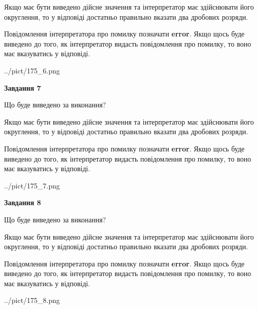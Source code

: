 \documentclass[12pt, ukrainian]{article}
\begin{document}
{\begin {Large}
Якщо має бути виведено дійсне значення та інтерпретатор має здійснювати його округлення, 
то у відповіді достатньо правильно вказати два дробових розряди.

Повідомлення інтерпретатора про помилку позначати \textbf{error}.
Якщо щось буде виведено до того, як інтерпретатор видасть повідомлення про помилку, 
то воно має вказуватись у відповіді. \par

\begin{center}
	{../pict/175_6.png}
\end{center}
\newpage

{\begin {center}\textbf{Завдання 7}\end {center}}\par
Що буде виведено за виконання? \par

Якщо має бути виведено дійсне значення та інтерпретатор має здійснювати його округлення, 
то у відповіді достатньо правильно вказати два дробових розряди.

Повідомлення інтерпретатора про помилку позначати \textbf{error}.
Якщо щось буде виведено до того, як інтерпретатор видасть повідомлення про помилку, 
то воно має вказуватись у відповіді. \par

\begin{center}
	{../pict/175_7.png}
\end{center}
\newpage

{\begin {center}\textbf{Завдання 8}\end {center}}\par
Що буде виведено за виконання? \par

Якщо має бути виведено дійсне значення та інтерпретатор має здійснювати його округлення, 
то у відповіді достатньо правильно вказати два дробових розряди.

Повідомлення інтерпретатора про помилку позначати \textbf{error}.
Якщо щось буде виведено до того, як інтерпретатор видасть повідомлення про помилку, 
то воно має вказуватись у відповіді. \par

\begin{center}
	{../pict/175_8.png}
\end{center}
\newpage


\end{Large}}
\end{document}
